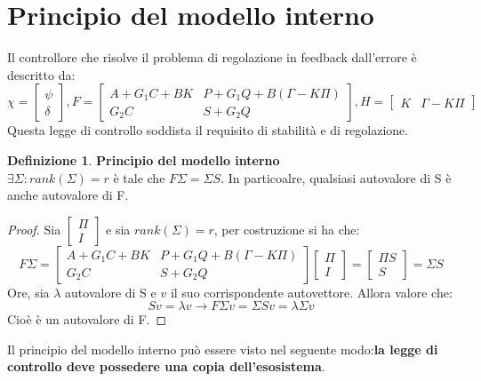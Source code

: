 \documentclass{article}
\theoremstyle{definition}
\newtheorem{definition}{\textbf{Definizione}}
\begin{document}
\section*{Principio del modello interno}
Il controllore che risolve il problema di regolazione in feedback dall'errore è descritto da:\begin{equation*}
    \chi=\begin{bmatrix}
        \psi \\\delta
    \end{bmatrix}, F =\begin{bmatrix}
        A+G_{1}C+BK&P+G_{1}Q+B(\Gamma-K\Pi)\\
        G_{2}C&S+G_{2}Q
    \end{bmatrix}, H = \begin{bmatrix}
        K&\Gamma-K\Pi
    \end{bmatrix}
\end{equation*}
Questa legge di controllo soddista il requisito di stabilità e di regolazione.
\begin{definition}{\textbf{Principio del modello interno}}\\
    \(\exists\Sigma:rank(\Sigma )=r \) è tale che \(F\Sigma = \Sigma S\). In particoalre, qualsiasi autovalore di S è anche autovalore di F.
\end{definition}
\begin{proof}
    Sia \(\begin{bmatrix}
        \Pi \\ I
    \end{bmatrix}\) e sia \(rank(\Sigma )=r\), per costruzione si ha che:\begin{equation*}
        F\Sigma=\begin{bmatrix}
            A+G_{1}C+BK&P+G_{1}Q+B(\Gamma-K\Pi)\\
            G_{2}C&S+G_{2}Q
        \end{bmatrix}\begin{bmatrix}
            \Pi \\ I
        \end{bmatrix}=\begin{bmatrix}
            \Pi S\\S
        \end{bmatrix}=\Sigma S
    \end{equation*}
    Ore, sia \(\lambda \) autovalore di S e \(v\) il suo corrispondente autovettore. Allora valore che:\begin{equation*}
        Sv = \lambda v\rightarrow F\Sigma v = \Sigma S v = \lambda\Sigma v
    \end{equation*}
    Cioè è un autovalore di F.
\end{proof}
Il principio del modello interno può essere visto nel seguente modo:\textbf{la legge di controllo deve possedere una copia dell'esosistema}.
\end{document}
